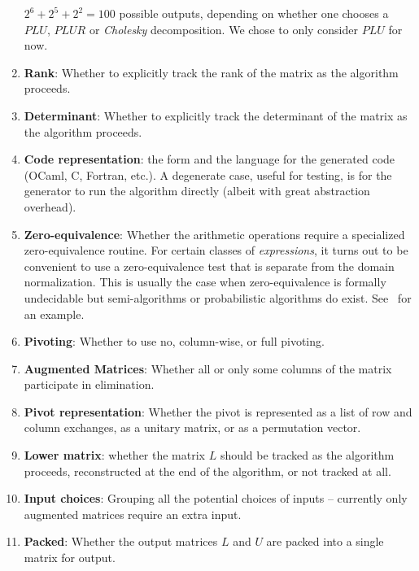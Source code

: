 \documentclass{elsart}
\begin{document}
\begin{enumerate}
        $2^6 + 2^5 + 2^2 = 100$ possible outputs, depending on whether
        one chooses a $PLU$, $PLUR$ or \emph{Cholesky} 
        decomposition.  We chose to only consider $PLU$ for now.
    \item \textbf{Rank}: Whether to explicitly track the rank of the matrix
        as the algorithm proceeds.
    \item \textbf{Determinant}:  Whether to explicitly track the determinant
        of the matrix as the algorithm proceeds.
    \item \textbf{Code representation}: the form and the language
      for the generated code (OCaml, C, Fortran, etc.). A
      degenerate case, useful for testing, is for the generator
      to run the algorithm directly (albeit with great
      abstraction overhead).
    \item \textbf{Zero-equivalence}: Whether the 
        arithmetic operations require a specialized zero-equivalence 
        routine.  For certain classes
        of \emph{expressions}, it turns out to be convenient to use 
        a zero-equivalence
        test that is separate from the domain normalization.  This is
        usually the case when zero-equivalence is formally undecidable
        but semi-algorithms or probabilistic algorithms do exist.
        See~\cite{ZhCaJeMo06a} for an example.
    \item \textbf{Pivoting}: Whether to use no, 
        column-wise, or full pivoting.
    \item \textbf{Augmented Matrices}: Whether all or only some
      columns of the matrix participate in elimination.
    \item \textbf{Pivot representation}: Whether the pivot is represented
      as a list of row and column exchanges, as a unitary matrix,
      or as a permutation vector.
  \item \textbf{Lower matrix}: whether the matrix $L$ should be tracked
      as the algorithm proceeds, reconstructed at the end of the
      algorithm, or not tracked at all.
  \item \textbf{Input choices}: Grouping all the potential
      choices of inputs -- currently only augmented matrices require
      an extra input.
  \item \textbf{Packed}: Whether the output matrices $L$ and $U$ are
      packed into a single matrix for output.
\setcounter{naspects}{\value{enumi}}
\end{enumerate}
\end{document}
